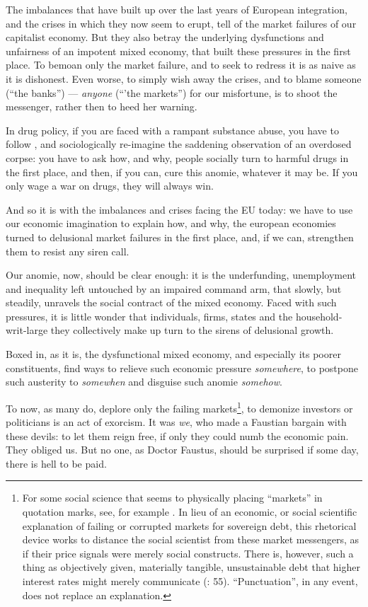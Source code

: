 \documentclass[11pt,a4paper,oneside,openright]{article}
\begin{document}
The imbalances that have built up over the last years of European integration, and the crises in which they now seem to erupt, tell of the market failures of our capitalist economy. 
But they also betray the underlying dysfunctions and unfairness of an impotent mixed economy, that built these pressures in the first place. 
To bemoan only the market failure, and to seek to redress it is as naive as it is dishonest. 
Even worse, to simply wish away the crises, and to blame someone (``the banks'') --- \emph{anyone} (``'the markets'') for our misfortune, is to shoot the messenger, rather then to heed her warning.

In drug policy, if you are faced with a rampant substance abuse, you have to follow \cite{Mills-1959-aa}, and sociologically re-imagine the saddening observation of an overdosed corpse: 
you have to ask how, and why, people socially turn to harmful drugs in the first place, and then, if you can, cure this anomie, whatever it may be. 
If you only wage a war on drugs, they will always win.

And so it is with the imbalances and crises facing the \gls{EU} today: 
we have to use our economic imagination to explain how, and why, the european economies turned to delusional market failures in the first place, and, if we can, strengthen them to resist any siren call. 

Our anomie, now, should be clear enough: 
it is the underfunding, unemployment and inequality left untouched by an impaired command arm, that slowly, but steadily, unravels the social contract of the mixed economy. 
Faced with such pressures, it is little wonder that individuals, firms, states and the household-writ-large they collectively make up turn to the sirens of delusional growth.

Boxed in, as it is, the dysfunctional mixed economy, and especially its poorer constituents, find ways to relieve such economic pressure \emph{somewhere}, to postpone such austerity to \emph{somewhen} and disguise such anomie \emph{somehow}. 

To now, as many do, deplore only the failing markets\footnote{
	For some social science that seems to physically placing ``markets'' in quotation marks, see, for example \citealt{Beckert2012}. 
	In lieu of an economic, or social scientific explanation of failing or corrupted markets for sovereign debt, this rhetorical device works to distance the social scientist from these market messengers, as if their price signals were merely social constructs. 
	There is, however, such a thing as objectively given, materially tangible, unsustainable debt that higher interest rates might merely communicate (\citealt{Wihlborg2010}: 55).
	 ``Punctuation'', in any event, does not replace an explanation.}, 
to demonize investors or politicians is an act of exorcism. 
It was \emph{we}, who made a Faustian bargain with these devils: 
to let them reign free, if only they could numb the economic pain. 
They obliged us. But no one, as Doctor Faustus, should be surprised if some day, there is hell to be paid.
\end{document}
